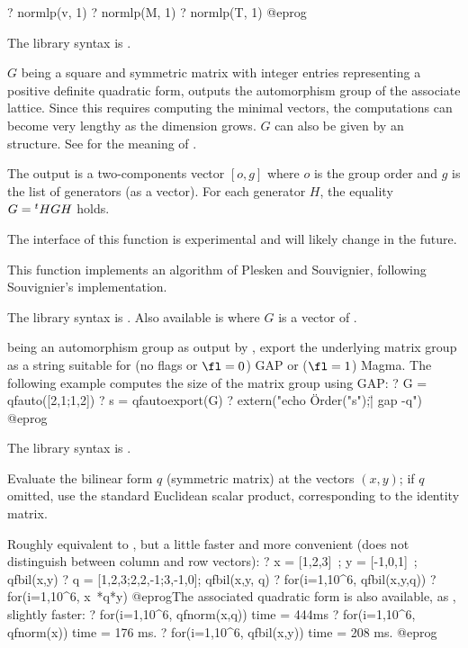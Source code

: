 ? normlp(v, 1)
? normlp(M, 1)
? normlp(T, 1)
@eprog

The library syntax is .

\label{se:qfauto}
$G$ being a square and symmetric matrix with integer entries representing a
positive definite quadratic form, outputs the automorphism group of the
associate lattice.
Since this requires computing the minimal vectors, the computations can
become very lengthy as the dimension grows. $G$ can also be given by an
 structure.
See  for the meaning of .

The output is a two-components vector $[o,g]$ where $o$ is the group order
and $g$ is the list of generators (as a vector). For each generator $H$,
the equality $G={^t}H\*G\*H$ holds.

The interface of this function is experimental and will likely change in the
future.

This function implements an algorithm of Plesken and Souvignier, following
Souvignier's implementation.

The library syntax is .
Also available is 
where $G$ is a vector of .

\label{se:qfautoexport}
 being an automorphism group as output by
, export the underlying matrix group as a string suitable
for (no flags or $\fl=0$) GAP or ($\fl=1$) Magma. The following example
computes the size of the matrix group using GAP:
\bprog
? G = qfauto([2,1;1,2])
? s = qfautoexport(G)
? extern("echo \"Order("s");\" | gap -q")
@eprog

The library syntax is .

\label{se:qfbil}
Evaluate the bilinear form $q$ (symmetric matrix)
at the vectors $(x,y)$; if $q$ omitted, use the standard Euclidean scalar
product, corresponding to the identity matrix.

Roughly equivalent to , but a little faster and
more convenient (does not distinguish between column and row vectors):
\bprog
? x = [1,2,3]~; y = [-1,0,1]~; qfbil(x,y)
? q = [1,2,3;2,2,-1;3,-1,0]; qfbil(x,y, q)
? for(i=1,10^6, qfbil(x,y,q))
? for(i=1,10^6, x~*q*y)
@eprog\noindent The associated quadratic form is also available, as
, slightly faster:
\bprog
? for(i=1,10^6, qfnorm(x,q))
time = 444ms
? for(i=1,10^6, qfnorm(x))
time = 176 ms.
? for(i=1,10^6, qfbil(x,y))
time = 208 ms.
@eprog

